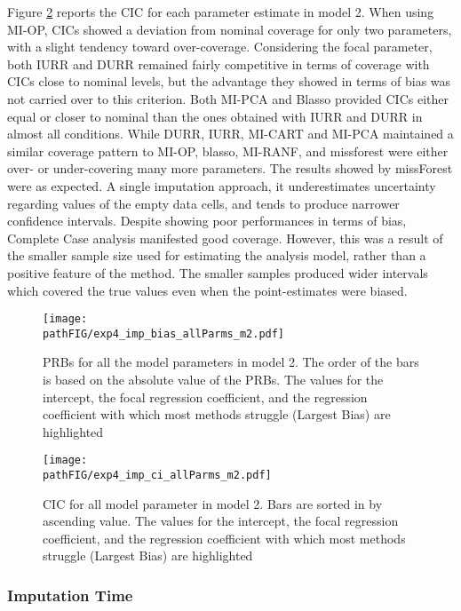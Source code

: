 	Figure \ref{fig:exp4_ci_allP} reports the CIC for each parameter estimate in model 2.
	When using MI-OP, CICs showed a deviation from nominal coverage for only two parameters, with a slight 
	tendency toward over-coverage.
	Considering the focal parameter, both IURR and DURR remained fairly competitive in terms of coverage with 
	CICs close to nominal levels, but the advantage they showed in terms of bias was not carried over to this criterion.
	Both MI-PCA and Blasso provided CICs either equal or closer to nominal than the ones obtained with IURR 
	and DURR in almost all conditions.
	While DURR, IURR, MI-CART and MI-PCA maintained a similar coverage pattern to MI-OP, 
	blasso, MI-RANF, and missforest were either over- or under-covering many more parameters.
	The results showed by missForest were as expected. 
	A single imputation approach, it underestimates uncertainty regarding values of the empty data cells, 
	and tends to produce narrower confidence intervals.
	Despite showing poor performances in terms of bias, Complete Case analysis manifested good 
	coverage.
	However, this was a result of the smaller sample size used for estimating the analysis model, rather than 
	a positive feature of the method.
	The smaller samples produced wider intervals which covered the true values even when the point-estimates 
	were biased.

\begin{figure}
	\centering
	\texttt{[image: \\pathFIG/exp4\_imp\_bias\_allParms\_m2.pdf]}
	\caption{PRBs for all the model parameters in model 2. 
		The order of the bars is based on the absolute value of the PRBs.
		The values for the intercept, the focal regression coefficient, and the regression coefficient with which most 
		methods struggle (Largest Bias) are highlighted}
	\label{fig:exp4_bias_allP}
\end{figure}

\begin{figure}
	\centering
	\texttt{[image: \\pathFIG/exp4\_imp\_ci\_allParms\_m2.pdf]}
	\caption{CIC for all model parameter in model 2.
		Bars are sorted in by ascending value.
		The values for the intercept, the focal regression coefficient, and the regression coefficient with which most 
		methods struggle (Largest Bias) are highlighted}
	\label{fig:exp4_ci_allP}
\end{figure}

\FloatBarrier

\subsubsection{Imputation Time}

